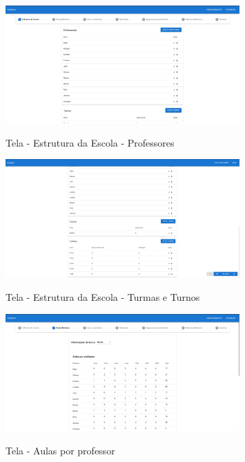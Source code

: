 \begin{figure}[h]
	\centering
	\caption{Tela - Estrutura da Escola - Professores}
	\includegraphics[width=0.8\textwidth]{./dados/figuras/tela_estrutura1}
	\label{fig:tela-estrutura1}
\end{figure}

\begin{figure}[h]
	\centering
	\caption{Tela - Estrutura da Escola - Turmas e Turnos}
	\includegraphics[width=0.8\textwidth]{./dados/figuras/tela_estrutura2_nova}
	\label{fig:tela-estrutura2}
\end{figure}

\begin{figure}[h]
	\centering
	\caption{Tela - Aulas por professor}
	\includegraphics[width=0.8\textwidth]{./dados/figuras/tela_aulas}
	\label{fig:tela-aulas}
\end{figure}

